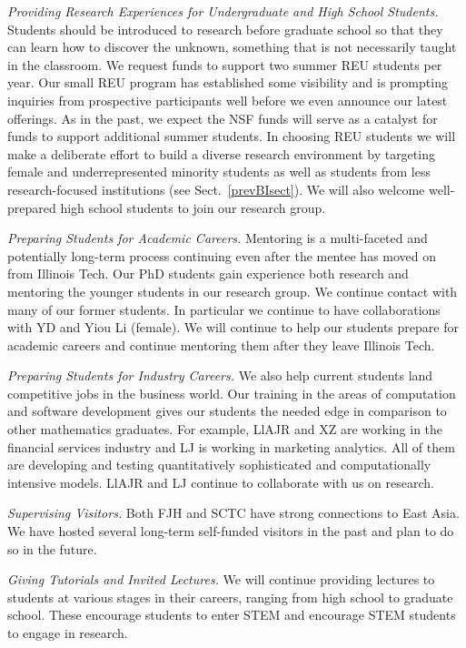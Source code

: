 \documentclass[11pt]{NSFamsart}
\begin{document}
\emph{Providing Research Experiences for Undergraduate and High School Students.} Students 
should be introduced to research before graduate school so that they can learn how to 
discover the unknown, something that is not necessarily taught in the classroom. We request funds 
to 
support two summer REU students per year.  Our small REU program has established some visibility 
and is prompting inquiries from prospective participants well before we 
even announce our latest 
offerings. As in the past, we expect the NSF funds will serve as a catalyst for funds to 
support additional summer students. In choosing REU students we will make a deliberate effort to 
build 
a diverse research environment by targeting female and underrepresented minority students as well 
as students from less research-focused institutions (see Sect.~\ref{prevBIsect}). We will also 
welcome well-prepared high school students to join our research group.

\emph{Preparing Students for Academic Careers.} Mentoring is a multi-faceted and 
potentially long-term process continuing even after the mentee has moved on from Illinois Tech.  
Our PhD students gain experience both research and mentoring the younger students in our 
research group.  We 
continue contact with many of our former students.  In particular we continue to have 
collaborations with YD and Yiou Li (female).  We will continue to help our students prepare for 
academic careers and continue mentoring them after they leave Illinois Tech.

\emph{Preparing Students for Industry Careers.}
We also help current students land 
competitive jobs in the business world. Our training in the areas of computation and software 
development gives our students the needed edge in comparison to other mathematics 
graduates. For example, LlAJR and XZ are working in the financial services industry and  LJ is 
working in marketing analytics.  All of them are developing and testing quantitatively sophisticated 
and computationally intensive models.  LlAJR and LJ continue to collaborate with us on research.

\emph{Supervising Visitors.}
Both FJH and SCTC have strong connections to East Asia.  We have hosted several long-term 
self-funded visitors in the past and plan to do so in the future.

\emph{Giving Tutorials and Invited Lectures.}
We will continue providing lectures to students at various stages in their careers, ranging from high
school to graduate school. These encourage students to enter STEM and encourage STEM students 
to engage in research.
\end{document}

